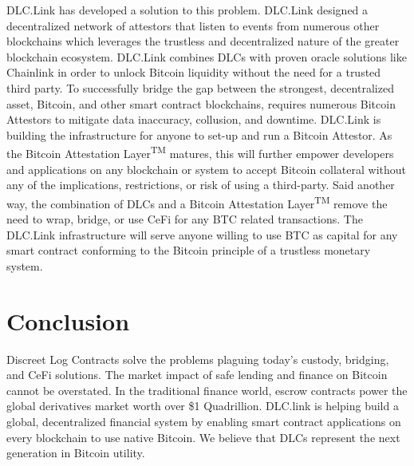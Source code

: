 \documentclass[twoside, a4paper, 11pt]{article}
\begin{document}
  DLC.Link has developed a solution to this problem. DLC.Link designed a decentralized network of attestors that listen to events from numerous other blockchains which leverages the trustless and decentralized nature of the greater blockchain ecosystem. DLC.Link combines DLCs with proven oracle solutions like Chainlink in order to unlock Bitcoin liquidity without the need for a trusted third party. To successfully bridge the gap between the strongest, decentralized asset, Bitcoin, and other smart contract blockchains, requires numerous Bitcoin Attestors to mitigate data inaccuracy, collusion, and downtime. DLC.Link is building the infrastructure for anyone to set-up and run a Bitcoin Attestor. As the Bitcoin Attestation Layer\textsuperscript{TM} matures, this will further empower developers and applications on any blockchain or system to accept Bitcoin collateral without any of the implications, restrictions, or risk of using a third-party. Said another way, the combination of DLCs and a Bitcoin Attestation Layer\textsuperscript{TM} remove the need to wrap, bridge, or use CeFi for any BTC related transactions. The DLC.Link infrastructure will serve anyone willing to use BTC as capital for any smart contract conforming to the Bitcoin principle of a trustless monetary system.

  \section{Conclusion}

  Discreet Log Contracts solve the problems plaguing today’s custody, bridging, and CeFi solutions. The market impact of safe lending and finance on Bitcoin cannot be overstated. In the traditional finance world, escrow contracts power the global derivatives market worth over \$1 Quadrillion. DLC.link is helping build a global, decentralized financial system by enabling smart contract applications on every blockchain to use native Bitcoin. We believe that DLCs represent the next generation in Bitcoin utility.
\end{document}
